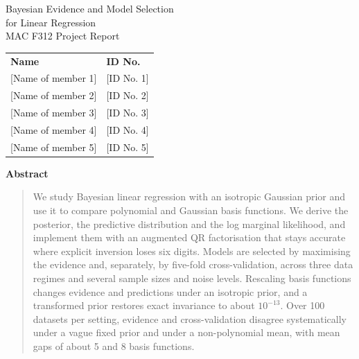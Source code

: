 \documentclass[10pt,a4paper]{article}
\begin{document}
\begin{center}
{\LARGE Bayesian Evidence and Model Selection\\[2pt] for Linear Regression}\\[4pt]
{\large MAC F312 Project Report}
\end{center}
\vspace{-2pt}
\begin{center}
\small
\begin{tabular}{@{}ll@{}}
\textbf{Name} & \textbf{ID No.}\\
{[Name of member 1]} & {[ID No. 1]}\\
{[Name of member 2]} & {[ID No. 2]}\\
{[Name of member 3]} & {[ID No. 3]}\\
{[Name of member 4]} & {[ID No. 4]}\\
{[Name of member 5]} & {[ID No. 5]}\\
\end{tabular}
\end{center}
\vspace{-4pt}
\begin{center}\textbf{\small Abstract}\end{center}
\vspace{-6pt}
\begin{quote}\small
We study Bayesian linear regression with an isotropic Gaussian prior and use it to compare polynomial and Gaussian basis functions. We derive the posterior, the predictive distribution and the log marginal likelihood, and implement them with an augmented QR factorisation that stays accurate where explicit inversion loses six digits. Models are selected by maximising the evidence and, separately, by five-fold cross-validation, across three data regimes and several sample sizes and noise levels. Rescaling basis functions changes evidence and predictions under an isotropic prior, and a transformed prior restores exact invariance to about $10^{-13}$. Over 100 datasets per setting, evidence and cross-validation disagree systematically under a vague fixed prior and under a non-polynomial mean, with mean gaps of about 5 and 8 basis functions.
\end{quote}
\vspace{-4pt}
\end{document}
